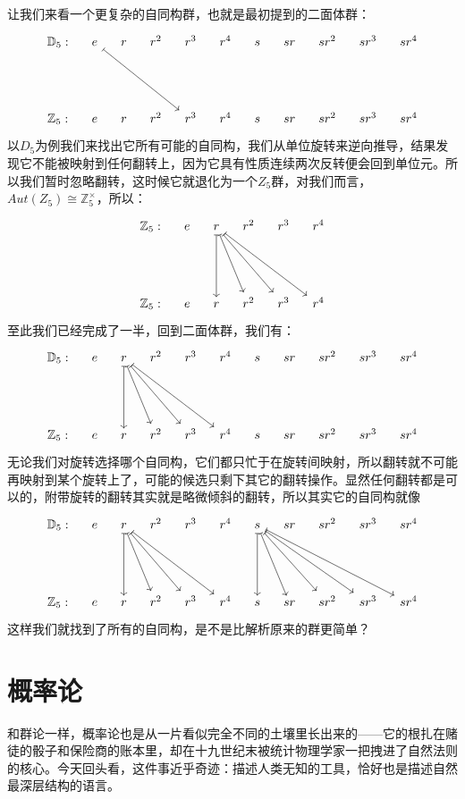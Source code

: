 \documentclass[UTF8]{ctexbook}
\begin{document}
让我们来看一个更复杂的自同构群，也就是最初提到的二面体群：
\[
\begin{tikzcd}[column sep=1em, row sep=4.5em]
\mathbb{D}_5:
& e \arrow[drrr, mapsto]
& r 
& r^2 
& r^3 
& r^4 
& s 
& sr 
& sr^2 
& sr^3 
& sr^4 
\\
\mathbb{Z}_5:
& e 
& r 
& r^2 
& r^3 
& r^4 
& s 
& sr 
& sr^2 
& sr^3 
& sr^4 
\end{tikzcd}
\]
以$D_5$为例我们来找出它所有可能的自同构，我们从单位旋转来逆向推导，结果发现它不能被映射到任何翻转上，因为它具有性质连续两次反转便会回到单位元。所以我们暂时忽略翻转，这时候它就退化为一个$Z_5$群，对我们而言，$Aut(Z_5) \cong \mathbb{Z}_{5}^{\times}$，所以：
\[
\begin{tikzcd}[column sep=1em, row sep=4.5em]
\mathbb{Z}_5:
& e 
& r \arrow[d, mapsto] \arrow[dr, mapsto]\arrow[drr, mapsto]\arrow[drrr, mapsto]
& r^2 
& r^3 
& r^4 
\\
\mathbb{Z}_5:
& e 
& r 
& r^2 
& r^3 
& r^4 
\end{tikzcd}
\]
至此我们已经完成了一半，回到二面体群，我们有：
\[
\begin{tikzcd}[column sep=1em, row sep=4.5em]
\mathbb{D}_5:
& e 
& r \arrow[d, mapsto] \arrow[dr, mapsto]\arrow[drr, mapsto]\arrow[drrr, mapsto]
& r^2 
& r^3 
& r^4 
& s 
& sr 
& sr^2 
& sr^3 
& sr^4 
\\
\mathbb{Z}_5:
& e 
& r 
& r^2 
& r^3 
& r^4 
& s 
& sr 
& sr^2 
& sr^3 
& sr^4 
\end{tikzcd}
\]
无论我们对旋转选择哪个自同构，它们都只忙于在旋转间映射，所以翻转就不可能再映射到某个旋转上了，可能的候选只剩下其它的翻转操作。显然任何翻转都是可以的，附带旋转的翻转其实就是略微倾斜的翻转，所以其实它的自同构就像
\[
\begin{tikzcd}[column sep=1em, row sep=4.5em]
\mathbb{D}_5:
& e 
& r \arrow[d, mapsto] \arrow[dr, mapsto]\arrow[drr, mapsto]\arrow[drrr, mapsto]
& r^2 
& r^3 
& r^4 
& s \arrow[d, mapsto] \arrow[dr, mapsto]\arrow[drr, mapsto]\arrow[drrr, mapsto]\arrow[drrrr, mapsto]
& sr 
& sr^2 
& sr^3 
& sr^4 
\\
\mathbb{Z}_5:
& e 
& r 
& r^2 
& r^3 
& r^4 
& s 
& sr 
& sr^2 
& sr^3 
& sr^4 
\end{tikzcd}
\]
这样我们就找到了所有的自同构，是不是比解析原来的群更简单？

\chapter{概率论}

和群论一样，概率论也是从一片看似完全不同的土壤里长出来的——它的根扎在赌徒的骰子和保险商的账本里，却在十九世纪末被统计物理学家一把拽进了自然法则的核心。今天回头看，这件事近乎奇迹：描述人类无知的工具，恰好也是描述自然最深层结构的语言。
\end{document}
